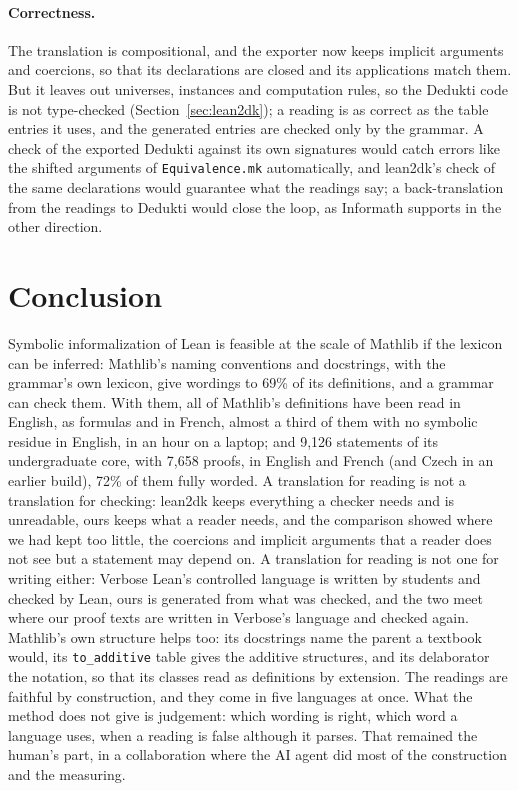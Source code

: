 \documentclass{easychair}
\newcommand{\ttt}[1]{\texttt{#1}}
\begin{document}
\paragraph{Correctness.} The translation is compositional, and the exporter now keeps implicit
arguments and coercions, so that its declarations are closed and its applications match them.
But it leaves out universes, instances and computation rules, so the Dedukti code is not
type-checked (Section~\ref{sec:lean2dk}); a reading is as correct as the table entries it uses,
and the generated entries are checked only by the grammar. A check of the exported Dedukti
against its own signatures would catch errors like the shifted arguments of
\ttt{Equivalence.mk} automatically, and lean2dk's check of the same declarations would
guarantee what the readings say; a back-translation from the readings to Dedukti would close the
loop, as Informath supports in the other direction.

\section{Conclusion}

Symbolic informalization of Lean is feasible at the scale of Mathlib if the lexicon can be
inferred: Mathlib's naming conventions and docstrings, with the grammar's own lexicon, give wordings to 69\% of its
definitions, and a grammar can check them. With them, all of Mathlib's definitions have been
read in English, as formulas and in French, almost a third of them with no symbolic residue in
English, in an hour on a laptop; and 9,126 statements of its undergraduate core, with 7,658
proofs, in English and French (and Czech in an earlier build), 72\% of them fully worded. A translation for reading is
not a translation for checking: lean2dk keeps everything a checker needs and is unreadable,
ours keeps what a reader needs, and the comparison showed where we had kept too little, the
coercions and implicit arguments that a reader does not see but a statement may depend on.
A translation for reading is not one for writing either: Verbose Lean's controlled language is
written by students and checked by Lean, ours is generated from what was checked, and the two
meet where our proof texts are written in Verbose's language and checked again. Mathlib's own structure helps too: its docstrings name the
parent a textbook would, its \ttt{to\_additive} table gives the additive structures, and its
delaborator the notation, so that its classes read as definitions by extension. The readings are faithful by construction, and they
come in five languages at once. What the method does not give is judgement: which wording is
right, which word a language uses, when a reading is false although it parses. That remained
the human's part, in a collaboration where the AI agent did most of the construction and the
measuring.
\end{document}
